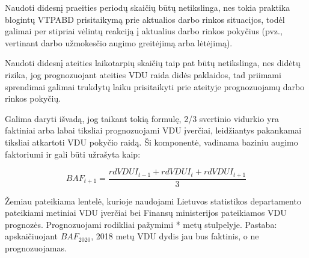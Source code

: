 \documentclass[titlepage, 11pt]{article}
\begin{document}
Naudoti didesnį praeities periodų skaičių būtų netikslinga, nes tokia praktika blogintų VTPABD prisitaikymą prie aktualios darbo rinkos situacijos, todėl galimai per stipriai vėlintų reakciją į aktualius darbo rinkos pokyčius (pvz., vertinant darbo užmokesčio augimo greitėjimą arba lėtėjimą).

Naudoti didesnį ateities laikotarpių  skaičių taip pat būtų netikslinga, nes  didėtų rizika, jog prognozuojant ateities VDU raida didės paklaidos, tad priimami sprendimai galimai trukdytų laiku prisitaikyti prie ateityje prognozuojamų darbo rinkos pokyčių.

Galima daryti išvadą, jog taikant tokią formulę, 2/3 svertinio vidurkio yra faktiniai arba labai tiksliai prognozuojami VDU įverčiai, leidžiantys pakankamai tiksliai atkartoti VDU pokyčio raidą. 
Ši komponentė, vadinama baziniu augimo faktoriumi ir gali būti užrašyta kaip: 

\begin{equation}
BAF_{t+1}=\frac{rdVDUI_{t-1}+rdVDUI_{t}+rdVDUI_{t+1}}{3}
\end{equation}

Žemiau pateikiama lentelė, kurioje naudojami Lietuvos statistikos departamento pateikiami metiniai VDU įverčiai bei Finansų ministerijos pateikiamos VDU prognozės. Prognozuojami rodikliai pažymimi * metų stulpelyje. Pastaba: apskaičiuojant $BAF_{2020}$, 2018 metų VDU dydis jau bus faktinis, o ne prognozuojamas.
\end{document}

